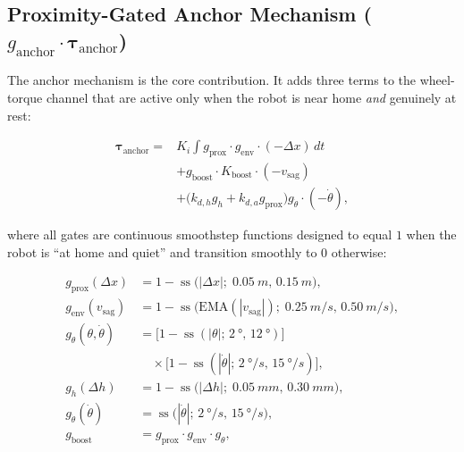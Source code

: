 \documentclass[conference]{IEEEtran}
\begin{document}
\subsection{Proximity-Gated Anchor Mechanism ($g_{\text{anchor}}\!\cdot\!\boldsymbol{\tau}_{\text{anchor}}$)}
\label{sec:anchor}

The anchor mechanism is the core contribution. It adds three terms to the wheel-torque channel that are active only when the robot is near home \emph{and} genuinely at rest:

\begin{equation}
\begin{split}
\boldsymbol{\tau}_{\text{anchor}} = {}
& K_i\!\int\! g_{\text{prox}}\cdot g_{\text{env}}\cdot(-\Delta x)\,dt\\
& + g_{\text{boost}}\cdot K_{\text{boost}}\cdot(-v_{\text{sag}})\\
& + \bigl(k_{d,h}g_h + k_{d,a}g_{\text{prox}}\bigr)g_{\dot{\theta}}\cdot(-\dot{\theta}),
\end{split}
\label{eq:anchor}
\end{equation}

where all gates are continuous smoothstep functions designed to equal $1$ when the robot is ``at home and quiet'' and transition smoothly to $0$ otherwise:

\begin{align}
g_{\text{prox}}(\Delta x) &= 1 - \operatorname{ss}\bigl(|\Delta x|;\;\SI{0.05}{m},\,\SI{0.15}{m}\bigr),
\label{eq:g_prox}\\[2pt]
g_{\text{env}}(v_{\text{sag}}) &= 1 - \operatorname{ss}\bigl(\mathrm{EMA}(|v_{\text{sag}}|);\;\SI{0.25}{m/s},\,\SI{0.50}{m/s}\bigr),
\label{eq:g_env}\\[2pt]
g_\theta(\theta,\dot{\theta}) &= \bigl[1 - \operatorname{ss}(|\theta|;\,\SI{2}{\degree},\,\SI{12}{\degree})\bigr] \nonumber\\
&\quad\times \bigl[1 - \operatorname{ss}(|\dot{\theta}|;\,\SI{2}{\degree/s},\,\SI{15}{\degree/s})\bigr],
\label{eq:g_theta}\\[2pt]
g_h(\Delta h) &= 1 - \operatorname{ss}\bigl(|\Delta h|;\;\SI{0.05}{mm},\,\SI{0.30}{mm}\bigr),
\label{eq:g_h}\\[2pt]
g_{\dot{\theta}}(\dot{\theta}) &= \operatorname{ss}\bigl(|\dot{\theta}|;\,\SI{2}{\degree/s},\,\SI{15}{\degree/s}\bigr),
\label{eq:g_thetadot}\\[2pt]
g_{\text{boost}} &= g_{\text{prox}}\cdot g_{\text{env}}\cdot g_\theta,
\label{eq:g_boost}
\end{align}
\end{document}

